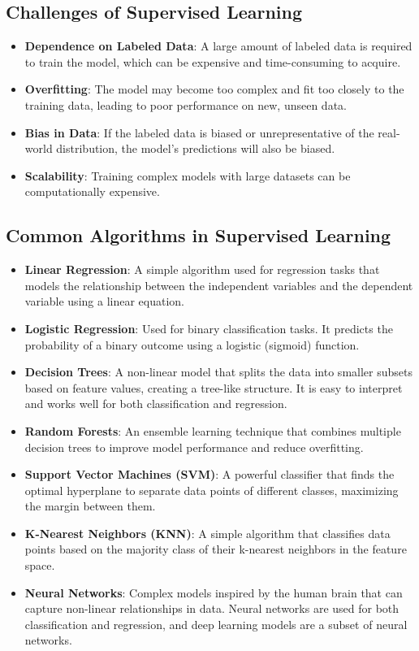 \subsection*{Challenges of Supervised Learning}

\begin{itemize}
    \item \textbf{Dependence on Labeled Data}:
    A large amount of labeled data is required to train the model, which can be expensive and time-consuming to acquire.
    \item \textbf{Overfitting}:
    The model may become too complex and fit too closely to the training data, leading to poor performance on new, unseen data.
    \item \textbf{Bias in Data}:
    If the labeled data is biased or unrepresentative of the real-world distribution, the model's predictions will also be biased.
    \item \textbf{Scalability}:
    Training complex models with large datasets can be computationally expensive.
\end{itemize}

\subsection*{Common Algorithms in Supervised Learning}

\begin{itemize}
    \item \textbf{Linear Regression}:
    A simple algorithm used for regression tasks that models the relationship between the independent variables and the dependent variable using a linear equation.
    \item \textbf{Logistic Regression}:
    Used for binary classification tasks. It predicts the probability of a binary outcome using a logistic (sigmoid) function.
    \item \textbf{Decision Trees}:
    A non-linear model that splits the data into smaller subsets based on feature values, creating a tree-like structure. It is easy to interpret and works well for both classification and regression.
    \item \textbf{Random Forests}:
    An ensemble learning technique that combines multiple decision trees to improve model performance and reduce overfitting.
    \item \textbf{Support Vector Machines (SVM)}:
    A powerful classifier that finds the optimal hyperplane to separate data points of different classes, maximizing the margin between them.
    \item \textbf{K-Nearest Neighbors (KNN)}:
    A simple algorithm that classifies data points based on the majority class of their k-nearest neighbors in the feature space.
    \item \textbf{Neural Networks}:
    Complex models inspired by the human brain that can capture non-linear relationships in data. Neural networks are used for both classification and regression, and deep learning models are a subset of neural networks.
\end{itemize}

